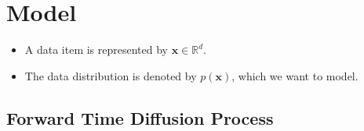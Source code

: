\documentclass[10pt]{article}
\newcommand{\ve}[1]{\mathbf{#1}}
\newcommand{\Real}{\mathbb{R}}
\begin{document}
\section{Model}

\begin{itemize}
  \item A data item is represented by $\ve{x} \in \Real^d$.
  
  \item The data distribution is denoted by $p(\ve{x})$, which we want to model.
\end{itemize}

\subsection{Forward Time Diffusion Process}
\end{document}
